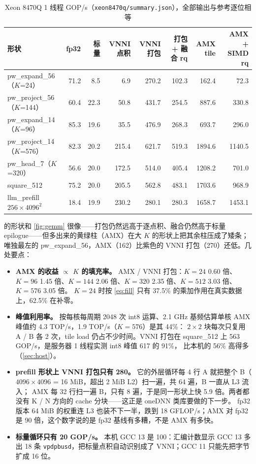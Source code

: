 \documentclass[11pt,a4paper]{ctexart}
\begin{document}
\begin{table}[H]
\centering\small
\caption{Xeon 8470Q 1 线程 GOP/s（\texttt{xeon8470q/summary.json}），全部输出与参考逐位相等}\label{tab:xgemm}
\footnotesize\setlength{\tabcolsep}{3.5pt}
\begin{tabular}{lrrrrrrr}
\toprule
形状 & fp32 & 标量 & VNNI 点积 & VNNI 打包 & 打包 + 融合 rq & \textbf{AMX tile} & AMX + SIMD rq \\
\midrule
pw\_expand\_56（$K$=24） & 71.2 & 8.5 & 6.9 & 270.2 & 102.3 & 162.4 & 72.3 \\
pw\_project\_56（$K$=144） & 60.4 & 22.3 & 50.8 & 431.7 & 254.5 & 887.6 & 330.8 \\
pw\_expand\_14（$K$=96） & 85.3 & 19.6 & 35.5 & 476.9 & 268.3 & 693.7 & 296.0 \\
pw\_project\_14（$K$=576） & 82.3 & 20.2 & 215.4 & 621.7 & 519.3 & 1894.6 & 1140.5 \\
pw\_head\_7（$K$=320） & 56.6 & 20.0 & 172.5 & 514.0 & 405.4 & 1208.2 & 701.0 \\
square\_512 & 75.2 & 20.0 & 205.5 & 562.8 & 483.1 & 1703.6 & 968.9 \\
llm\_prefill $256\times4096^2$ & 18.4 & 19.9 & 230.2 & 280.1 & 280.3 & 1658.7 & 1453.1 \\
\bottomrule
\end{tabular}
\end{table}

 的形状和 \cref{fig:gemm} 很像——打包仍然远高于逐点积、融合仍然高于标量 epilogue——但多出来的黄绿柱（AMX）在大 $K$ 的形状上把其余柱压成了矮条；
唯独最左的 pw\_expand\_56，AMX（162）比紫色的 VNNI 打包（270）还低。几处要点：

\begin{itemize}
  \item \textbf{AMX 的收益 $\propto$ $K$ 的填充率。} AMX / VNNI 打包：$K=24$ 0.60 倍、$K=96$ 1.45 倍、$K=144$ 2.06 倍、$K=320$ 2.35 倍、$K=512$ 3.03 倍、$K=576$ 3.05 倍。
        $K=24$ 时按 \cref{eq:fill} 只有 37.5\% 的乘加作用在真实数据上，62.5\% 在补零。
  \item \textbf{峰值利用率。} 按每核每周期 2048 次 int8 运算、2.1 GHz 基频估算单核 AMX 峰值约 4.3 TOP/s，1.9 TOP/s（$K=576$）是其 44\%：
        $2\times2$ 块每次只复用 A / B 各 2 次，tile load 仍占不少时间。VNNI 打包在 square\_512 上 563 GOP/s，是服务器 1 线程实测 int8 峰值 617 的 91\%，
        比本机的 56\% 高得多（\cref{sec:host}）。
  \item \textbf{prefill 形状上 VNNI 打包只有 280。} 它的外层循环每 4 行 A 就把整个 B（$4096\times4096$ = 16 MiB，超出 2 MiB L2）扫一遍，共 64 遍，B 一直从 L3 流入；
        AMX 每 32 行扫一遍 B，只有 8 遍，于是同一形状上快 5.9 倍。两者都没有 K / N 方向的 cache 分块——这正是 oneDNN 类库要做的下一步。
        fp32 版本 64 MiB 的权重连 L3 也装不下一半，跌到 18 GFLOP/s；AMX 对 fp32 是 90 倍，这个数字说的是 fp32 基线有多糟，不是 AMX 有多快。
  \item \textbf{标量循环只有 20 GOP/s。} 本机 GCC 13 是 100：汇编计数显示 GCC 13 多出 18 条 \texttt{vpdpbusd}，把标量点积自动识别成了 VNNI；GCC 11 只能先把字节扩成 16 位。
\end{itemize}
\end{document}
